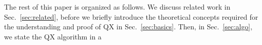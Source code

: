 \documentclass[]{elsarticle}
\begin{document}
	
	The rest of this paper is organized as follows. We discuss related work in Sec.~\ref{sec:related}, before we briefly introduce the theoretical concepts required for the understanding and proof of QX in Sec.~\ref{sec:basics}. Then, in Sec.~\ref{sec:algo}, we state the QX algorithm in a 
\end{document}

